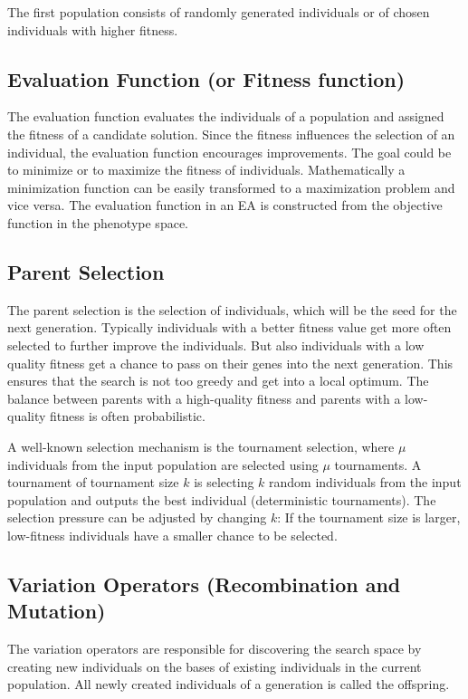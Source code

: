         The first population consists of randomly generated individuals or of chosen individuals with higher fitness.
        
        \subsection{Evaluation Function (or Fitness function)}
        The evaluation function evaluates the individuals of a population and assigned the fitness of a candidate solution. Since the fitness influences the selection of an individual, the evaluation function encourages improvements. The goal could be to minimize or to maximize the fitness of individuals. Mathematically a minimization function can be easily transformed to a maximization problem and vice versa. The evaluation function in an EA is constructed from the objective function in the phenotype space.
        
        \subsection{Parent Selection}
        \label{sec:parentSelection}
        The parent selection is the selection of individuals, which will be the seed for the next generation. Typically individuals with a better fitness value get more often selected to further improve the individuals. But also individuals with a low quality fitness get a chance to pass on their genes into the next generation. This ensures that the search is not too greedy and get into a local optimum. The balance between parents with a high-quality fitness and parents with a low-quality fitness is often probabilistic.
        
        A well-known selection mechanism is the tournament selection, where $\mu$ individuals from the input population are selected using $\mu$ tournaments. A tournament of tournament size $k$ is selecting $k$ random individuals from the input population and outputs the best individual (deterministic tournaments)\cite{Eiben}. The selection pressure can be adjusted by changing $k$: If the tournament size is larger, low-fitness individuals have a smaller chance to be selected.
           
        \subsection{Variation Operators (Recombination and Mutation)}
        The variation operators are responsible for discovering the search space by creating new individuals on the bases of existing individuals in the current population. All newly created individuals of a generation is called the offspring.
        
